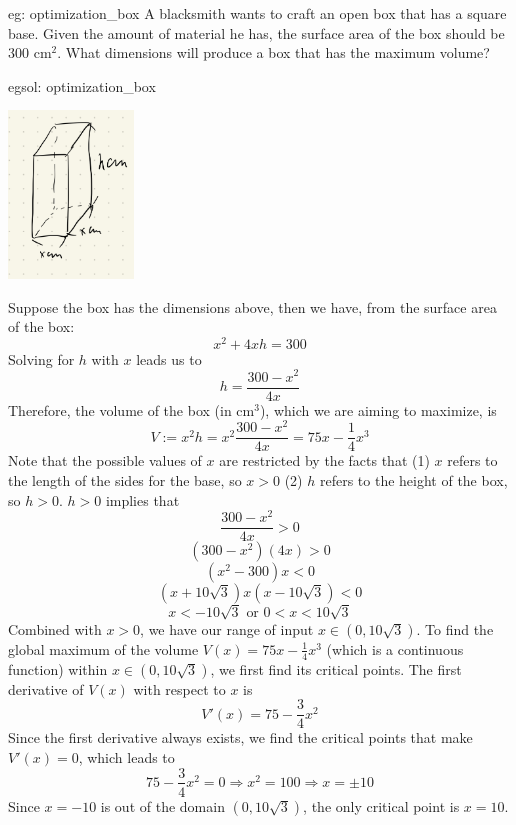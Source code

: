 \begin{eg}[]{eg: optimization_box}
    A blacksmith wants to craft an open box that has a square base.  Given the amount of material he has, the surface area of the box should be 300 cm$^2$.  What dimensions will produce a box that has the maximum volume?
\end{eg}

\begin{egsol}[]{egsol: optimization_box}
    \begin{center}
        \includegraphics[width = 0.25\textwidth]{figures/chap 05/optimization_box.png}
        \label{fig: ex_optimization_box}
    \end{center}
    Suppose the box has the dimensions above, then we have, from the surface area of the box:
    \[x^2+4xh = 300\]
    Solving for $h$ with $x$ leads us to
    \[h = \frac{300-x^2}{4x}\]
    Therefore, the volume of the box (in cm$^3$), which we are aiming to maximize, is
    \[V := x^2h = x^2\frac{300-x^2}{4x} = 75x-\frac{1}{4}x^3\]
    Note that the possible values of $x$ are restricted by the facts that (1) $x$ refers to the length of the sides for the base, so $x > 0$ (2) $h$ refers to the height of the box, so $h > 0$. $h > 0$ implies that
    \[\frac{300-x^2}{4x} > 0\]
    \[(300-x^2)(4x) > 0\]
    \[(x^2-300)x < 0\]
    \[(x+10\sqrt{3})x(x-10\sqrt{3}) < 0\]
    \[x < -10\sqrt{3} \text{ or } 0 < x < 10\sqrt{3}\]
    Combined with $x > 0$, we have our range of input $x \in (0,10\sqrt{3})$.  To find the global maximum of the volume $V(x) = 75x - \frac{1}{4}x^3$ (which is a continuous function) within $x \in (0, 10\sqrt{3})$, we first find its critical points.  The first derivative of $V(x)$ with respect to $x$ is 
    \[V'(x) = 75 - \frac{3}{4}x^2\]
    Since the first derivative always exists, we find the critical points that make $V'(x) = 0$, which leads to
    \[75-\frac{3}{4}x^2 = 0 \Rightarrow x^2 = 100 \Rightarrow x = \pm 10\]
    Since $x = -10$ is out of the domain $(0, 10\sqrt{3})$, the only critical point is $x = 10$.
    

\end{egsol}
